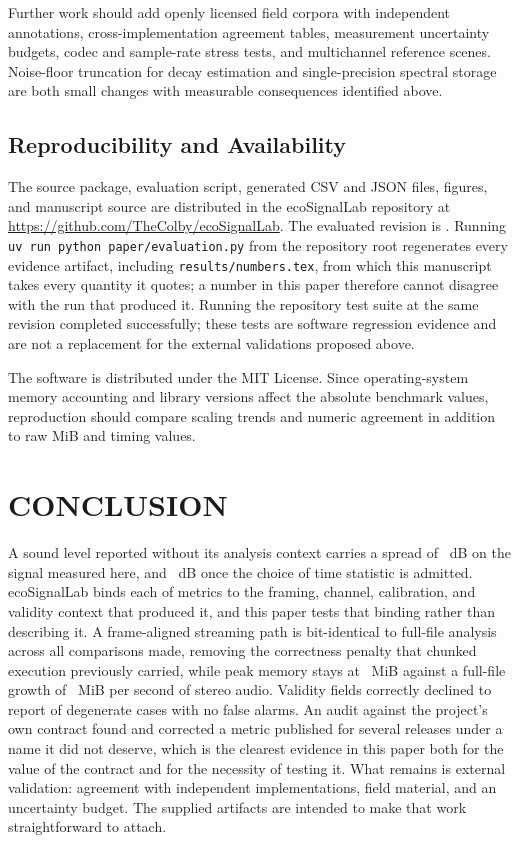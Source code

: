 \documentclass[final]{jaes}
\begin{document}
Further work should add openly licensed field corpora with independent annotations, cross-implementation agreement tables, measurement uncertainty budgets, codec and sample-rate stress tests, and multichannel reference scenes. Noise-floor truncation for decay estimation and single-precision spectral storage are both small changes with measurable consequences identified above.

\subsection{Reproducibility and Availability}

The source package, evaluation script, generated CSV and JSON files, figures, and manuscript source are distributed in the ecoSignalLab repository at \url{https://github.com/TheColby/ecoSignalLab}. The evaluated revision is \texttt{\eslCommitFull}. Running \texttt{uv run python paper/evaluation.py} from the repository root regenerates every evidence artifact, including \texttt{results/numbers.tex}, from which this manuscript takes every quantity it quotes; a number in this paper therefore cannot disagree with the run that produced it. Running the repository test suite at the same revision completed successfully; these tests are software regression evidence and are not a replacement for the external validations proposed above.

The software is distributed under the MIT License. Since operating-system memory accounting and library versions affect the absolute benchmark values, reproduction should compare scaling trends and numeric agreement in addition to raw MiB and timing values.

\section{CONCLUSION}

A sound level reported without its analysis context carries a spread of \dispConservativeRange~dB on the signal measured here, and \dispRange~dB once the choice of time statistic is admitted. ecoSignalLab binds each of \eslMetricTotal{} metrics to the framing, channel, calibration, and validity context that produced it, and this paper tests that binding rather than describing it. A frame-aligned streaming path is bit-identical to full-file analysis across all \streamChecked{} comparisons made, removing the correctness penalty that chunked execution previously carried, while peak memory stays at \memStreamIntercept~MiB against a full-file growth of \memFullSlope~MiB per second of stereo audio. Validity fields correctly declined to report \valCorrect{} of \valExpected{} degenerate cases with no false alarms. An audit against the project's own contract found and corrected a metric published for several releases under a name it did not deserve, which is the clearest evidence in this paper both for the value of the contract and for the necessity of testing it. What remains is external validation: agreement with independent implementations, field material, and an uncertainty budget. The supplied artifacts are intended to make that work straightforward to attach.
\end{document}
